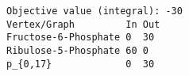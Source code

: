 \begin{verbatim}
Objective value (integral): -30
Vertex/Graph         In Out 
Fructose-6-Phosphate 0  30  
Ribulose-5-Phosphate 60 0   
p_{0,17}             0  30  
\end{verbatim}
